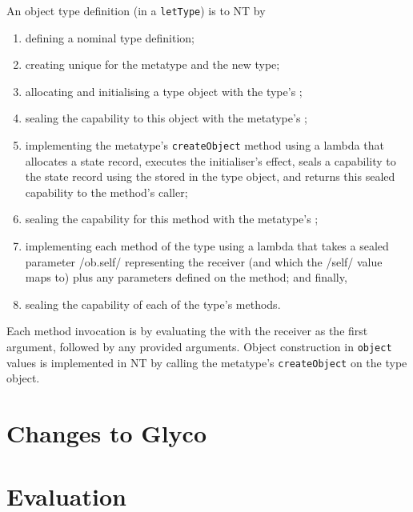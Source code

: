 \documentclass[main.tex]{subfiles}
\begin{document}
An object type definition (in a \texttt{letType}) is \lowered{} to NT by
\begin{enumerate}[nosep]
	
	\item defining a nominal type definition;
	
	\item creating unique  for the metatype and the new type;
	
	\item allocating and initialising a type object with the type's ;
	\item sealing the capability to this object with the metatype's ;
	
	\item implementing the metatype's \texttt{createObject} method using a lambda that allocates a state record, executes the initialiser's effect, seals a capability to the state record using the  stored in the type object, and returns this sealed capability to the method's caller;
	\item sealing the capability for this method with the metatype's ;
	
	\item implementing each method of the type using a lambda that takes a sealed parameter \iil/ob.self/ representing the receiver (and which the \iil/self/ value maps to) plus any parameters defined on the method; and finally,
	\item sealing the capability of each of the type's methods.
	
\end{enumerate}

Each method invocation is \lowered{} by evaluating the  with the receiver as the first argument, followed by any provided arguments. Object construction in \texttt{object} values is implemented in NT by calling the metatype's \texttt{createObject}  on the type object.

\section{Changes to Glyco} \label{sct:obj-changes}

\section{Evaluation} \label{sct:obj-eval}

\onlyinsubfile{\glsaddall\printglossaries}
\end{document}
